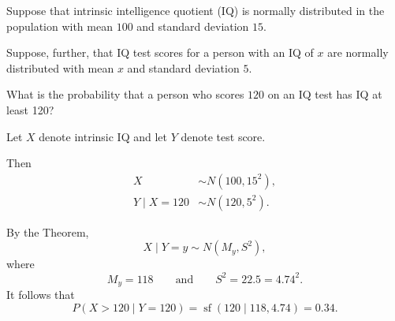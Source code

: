 \documentclass{beamer}
\DeclareMathOperator{\SF}{sf}
\begin{document}
\begin{frame}
    \setlength\parskip{1em}
    Suppose that intrinsic intelligence quotient (IQ) is normally distributed in the
    population with mean $100$ and standard deviation $15$.

    Suppose, further, that IQ test scores for a person with an IQ of $x$
    are normally distributed with mean $x$ and standard deviation $5$.

    What is the probability that a person who scores $120$ on an IQ test has IQ at least 120?
    
\end{frame}

\begin{frame}
    Let $X$ denote intrinsic IQ and let $Y$ denote test score.

    Then
    \begin{align*}
    X&\sim N(100,15^2),\\
    Y\mid X=120&\sim N(120, 5^2).
    \end{align*}

    By the Theorem,
    \[
    X\mid Y=y\sim N(M_y, S^2),
    \]
    where
    \[
    M_y = 118
    \qquad\text{and}\qquad
    S^2 = 22.5 = 4.74^2.
    \]
    It follows that
    \[
    P(X > 120\mid Y=120) = \SF(120\mid 118, 4.74) = 0.34.
    \]
\end{frame}
\end{document}
